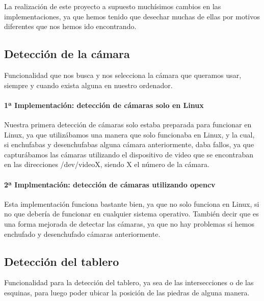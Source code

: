 \documentclass[12pt,a4paper]{report}
\begin{document}
La realización de este proyecto a supuesto muchísimos cambios en las
implementaciones, ya que hemos tenido que desechar muchas de ellas por motivos
diferentes que nos hemos ido encontrando. 


\subsection{Detección de la cámara} 
Funcionalidad que nos busca y nos selecciona la cámara que queramos usar,
siempre y cuando exista alguna en nuestro ordenador. 

\paragraph{1ª Implementación: detección de cámaras solo en Linux}

Nuestra primera detección de cámaras solo estaba preparada para funcionar en
Linux, ya que utilizábamos una manera que solo funcionaba en Linux, y la cual,
si enchufabas y desenchufabas alguna cámara anteriormente, daba fallos, ya que
capturábamos las cámaras utilizando el dispositivo de video que se encontraban
en las direcciones /dev/videoX, siendo X el número de la cámara. 

\paragraph{2ª Implmentación: detección de cámaras utilizando opencv}

Esta implementación funciona bastante bien, ya que no solo funciona en Linux, 
si no que debería de funcionar en cualquier sistema operativo. También decir que
es una forma mejorada de detectar las cámaras, ya que no hay problemas si hemos
enchufado y desenchufado cámaras anteriormente. 


\subsection{Detección del tablero} 
Funcionalidad para la detección del tablero, ya sea de las intersecciones o de
las esquinas, para luego poder ubicar la posición de las piedras de alguna
manera. 
\end{document}
